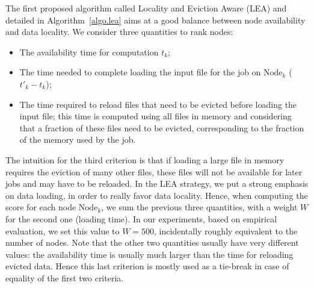 \documentclass[sigconf,review,anonymous]{acmart}
\newcommand{\Node}[1]{\ensuremath{\mathrm{Node}_{#1}}\xspace}
\begin{document}
The first proposed algorithm called Locality and Eviction Aware (LEA)
and detailed in Algorithm~\ref{algo.lea} aims at a good balance
between node availability and data locality.  We consider three
quantities to rank nodes:
\begin{itemize}
\item The availability time for computation $t_k$;
\item The time needed to complete loading the input file for the job
  on \Node{k} ($t'_k - t_k$);
\item The time required to reload files that need to be evicted before
  loading the input file; this time is computed using all files in
  memory and considering that a fraction of these files need to be
  evicted, corresponding to the fraction of the memory used by the job.
\end{itemize}

The intuition for the third criterion is that if loading a large file
in memory requires the eviction of many other files, these files will not
be available for later jobs and may have to be reloaded.
In the LEA strategy, we put a strong emphasis on data loading, in order
to really favor data locality. Hence, when computing the score for
each node \Node{k}, we sum the previous three quantities, with a weight
$W$ for the second one (loading time). In our experiments, based on
empirical evaluation, we set this value to $W=500$, incidentally roughly
equivalent to the number of nodes.
Note that the other two quantities usually have very different values:
the availability time is usually much larger than the time for
reloading evicted data. Hence this last criterion is mostly used as a
tie-break in case of equality of the first two criteria.
\end{document}
